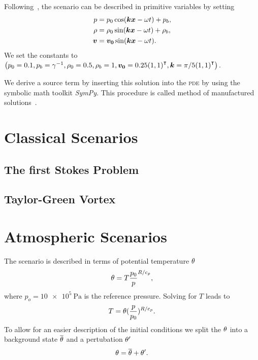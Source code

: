 Following~\cite{dumbser2010arbitrary}, the scenario can be described in primitive variables by setting
\begin{align}
  p &= p_0 \cos( \bm{k} \bm{x} - \omega t ) + p_b, \\
  \rho &= \rho_0 \sin (\bm{k} \bm{x} - \omega t) + \rho_b, \\
  \bm{v} &= \bm{v_0} \sin(\bm{k} \bm{x} - \omega t).
\end{align}
We set the constants to \( \left(  p_0 = 0.1, p_b = \gamma^{-1}, \rho_0 = 0.5, \rho_b = 1, 
\bm{v_0} = 0.25 {(1,1)}^\intercal, \bm{k} = \pi/5 {(1,1)}^\intercal \right) \).

We derive a source term by inserting this solution into the \textsc{pde} by using the symbolic math toolkit \textit{SymPy}.
This procedure is called method of manufactured solutions~\cite{salari2000code}.

\section{Classical Scenarios}

\subsection{The first Stokes Problem}
\cite{dumbser2010arbitrary}
\subsection{Taylor-Green Vortex}
\cite{dumbser2016high}

\section{Atmospheric Scenarios}
The scenario is described in terms of potential temperature $\theta$
\begin{equation}
  \theta = T \frac{p_0}{p}^{R/c_p},
\end{equation}
where $p_o = \SI{10e5}{\Pa}$ is the reference pressure.
Solving for $T$ leads to
\begin{equation}
  \label{eq:potTToT}
  T = \theta (\frac{p}{p_0})^{R/c_p}.
\end{equation}
To allow for an easier description of the initial conditions we split the $\theta$ into a background state $\overline{\theta}$ and a pertubation $\theta'$
\begin{equation}
  \label{eq:potT-split}
  \theta = \overline{\theta} + \theta'.
\end{equation}

